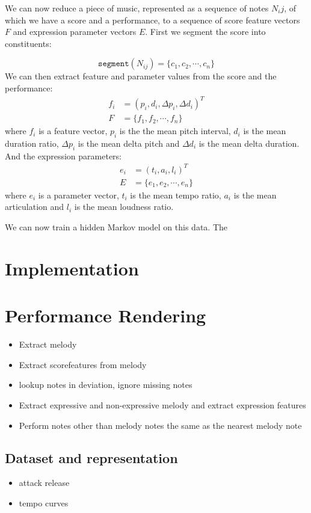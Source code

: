 \documentclass[a4paper,10pt]{article}
\begin{document}
We can now reduce a piece of music, represented as a sequence of notes $N_ij$, of which we have a score and a performance, to a sequence of score feature vectors $F$ and expression parameter vectors $E$. First we segment the score into constituents:

\[\texttt{segment}(N_{ij}) = \{c_1, c_2, \cdots, c_n\}\]
We can then extract feature and parameter values from the score and the performance:
\begin{align*}
f_i &= (p_i, d_i, \Delta p_i, \Delta d_i)^T\\
F &= \{f_1, f_2, \cdots, f_n\}
\end{align*}
where $f_i$ is a feature vector, $p_i$ is the the mean pitch interval, $d_i$ is the mean duration ratio, $\Delta p_i$ is the mean delta pitch and $\Delta d_i$ is the mean delta duration.
And the expression parameters: 
\begin{align*}
e_i &= (t_i, a_i, l_i)^T\\
E &= \{e_1, e_2, \cdots, e_n\}
\end{align*}
where $e_i$ is a parameter vector, $t_i$ is the mean tempo ratio, $a_i$ is the mean articulation and $l_i$ is the mean loudness ratio.

We can now train a hidden Markov model on this data. The 


\section{Implementation}
\section{Performance Rendering}
\begin{itemize}
\item Extract melody
\item Extract scorefeatures from melody
\item lookup notes in deviation, ignore missing notes
\item Extract expressive and non-expressive melody and extract expression features
\item Perform notes other than melody notes the same as the nearest melody note
\end{itemize}
\subsection{Dataset and representation}
\begin{itemize}
\item attack release
\item tempo curves
\end{itemize}
\end{document}
